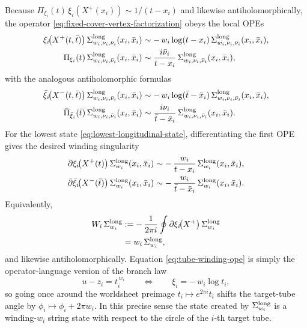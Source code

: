\documentclass[11pt]{article}
\begin{document}
Because $\Pi_{\xi_i}(t)\,\xi_i(X^+(x_i))\sim 1/(t-x_i)$ and likewise antiholomorphically, the operator \eqref{eq:fixed-cover-vertex-factorization} obeys the local OPEs
\begin{equation}\label{eq:longitudinal-local-opes}
\begin{aligned}
\xi_i\!\big(X^+(t,\bar t)\big)\,\Sigma^{\rm long}_{w_i,\nu_i,\bar\nu_i}(x_i,\bar x_i)
&\sim
-\,w_i\log(t-x_i)\,\Sigma^{\rm long}_{w_i,\nu_i,\bar\nu_i}(x_i,\bar x_i),
\\
\Pi_{\xi_i}(t)\,\Sigma^{\rm long}_{w_i,\nu_i,\bar\nu_i}(x_i,\bar x_i)
&\sim
\frac{i\bar\nu_i}{t-x_i}\,
\Sigma^{\rm long}_{w_i,\nu_i,\bar\nu_i}(x_i,\bar x_i),
\end{aligned}
\end{equation}
with the analogous antiholomorphic formulas
\[
\begin{aligned}
\bar\xi_i\!\big(X^-(t,\bar t)\big)\,\Sigma^{\rm long}_{w_i,\nu_i,\bar\nu_i}(x_i,\bar x_i)
&\sim
-\,w_i\log(\bar t-\bar x_i)\,\Sigma^{\rm long}_{w_i,\nu_i,\bar\nu_i}(x_i,\bar x_i),
\\
\bar\Pi_{\bar\xi_i}(\bar t)\,\Sigma^{\rm long}_{w_i,\nu_i,\bar\nu_i}(x_i,\bar x_i)
&\sim
\frac{i\nu_i}{\bar t-\bar x_i}\,
\Sigma^{\rm long}_{w_i,\nu_i,\bar\nu_i}(x_i,\bar x_i).
\end{aligned}
\]
For the lowest state \eqref{eq:lowest-longitudinal-state}, differentiating the first OPE gives the desired winding singularity
\begin{equation}\label{eq:tube-winding-ope}
\begin{aligned}
\partial \xi_i\!\big(X^+(t)\big)\,
\Sigma^{\rm long}_{w_i}(x_i,\bar x_i)
&\sim
-\,\frac{w_i}{t-x_i}\,
\Sigma^{\rm long}_{w_i}(x_i,\bar x_i),
\\
\bar\partial \bar\xi_i\!\big(X^-(\bar t)\big)\,
\Sigma^{\rm long}_{w_i}(x_i,\bar x_i)
&\sim
-\,\frac{w_i}{\bar t-\bar x_i}\,
\Sigma^{\rm long}_{w_i}(x_i,\bar x_i).
\end{aligned}
\end{equation}
Equivalently,
\begin{equation}\label{eq:tube-winding-charge}
\begin{aligned}
W_i\,\Sigma^{\rm long}_{w_i}
&:=
-\,\frac{1}{2\pi i}\oint \partial \xi_i\!\big(X^+\big)\,
\Sigma^{\rm long}_{w_i}
\\
&=
w_i\,\Sigma^{\rm long}_{w_i},
\end{aligned}
\end{equation}
and likewise antiholomorphically. Equation \eqref{eq:tube-winding-ope} is simply the operator-language version of the branch law
\begin{equation}\label{eq:single-string-tube-winding}
u-z_i=t_i^{\,w_i}
\qquad\Longleftrightarrow\qquad
\xi_i=-\,w_i\log t_i,
\end{equation}
so going once around the worldsheet preimage $t_i\mapsto e^{2\pi i}t_i$ shifts the target-tube angle by $\phi_i\mapsto \phi_i+2\pi w_i$. In this precise sense the state created by $\Sigma^{\rm long}_{w_i}$ is a winding-$w_i$ string state with respect to the circle of the $i$-th target tube.
\end{document}

